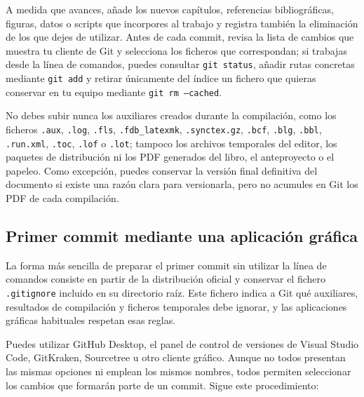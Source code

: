 A medida que avances, añade los nuevos capítulos, referencias bibliográficas, figuras, datos o scripts que incorpores al trabajo y registra también la eliminación de los que dejes de utilizar. Antes de cada commit, revisa la lista de cambios que muestra tu cliente de Git y selecciona los ficheros que correspondan; si trabajas desde la línea de comandos, puedes consultar \texttt{git status}, añadir rutas concretas mediante \texttt{git add} y retirar únicamente del índice un fichero que quieras conservar en tu equipo mediante \texttt{git rm --cached}.

No debes subir nunca los auxiliares creados durante la compilación, como los ficheros \texttt{.aux}, \texttt{.log}, \texttt{.fls}, \texttt{.fdb\_latexmk}, \texttt{.synctex.gz}, \texttt{.bcf}, \texttt{.blg}, \texttt{.bbl}, \texttt{.run.xml}, \texttt{.toc}, \texttt{.lof} o \texttt{.lot}; tampoco los archivos temporales del editor, los paquetes de distribución ni los PDF generados del libro, el anteproyecto o el papeleo. Como excepción, puedes conservar la versión final definitiva del documento si existe una razón clara para versionarla, pero no acumules en Git los PDF de cada compilación.

\subsection{Primer commit mediante una aplicación gráfica}

La forma más sencilla de preparar el primer commit sin utilizar la línea de comandos consiste en partir de la distribución oficial y conservar el fichero \texttt{.gitignore} incluido en su directorio raíz. Este fichero indica a Git qué auxiliares, resultados de compilación y ficheros temporales debe ignorar, y las aplicaciones gráficas habituales respetan esas reglas.

Puedes utilizar GitHub Desktop, el panel de control de versiones de Visual Studio Code, GitKraken, Sourcetree u otro cliente gráfico. Aunque no todos presentan las mismas opciones ni emplean los mismos nombres, todos permiten seleccionar los cambios que formarán parte de un commit. Sigue este procedimiento:


